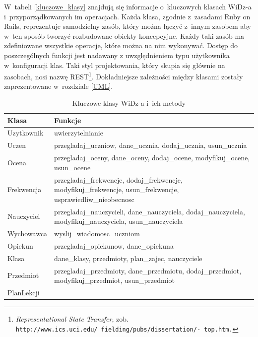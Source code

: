 \documentclass[12pt,leqno,twoside]{mwart}
\begin{document}
\indent W~tabeli \ref{kluczowe_klasy} znajdują się informacje o~kluczowych klasach WiDz-a i~przyporządkowanych im operacjach. Każda klasa, zgodnie z~zasadami Ruby on Rails, reprezentuje samodzielny zasób, który można łączyć z~innym zasobem aby w~ten sposób tworzyć rozbudowane obiekty koncepcyjne. Każdy taki zasób ma zdefiniowane wszystkie operacje, które można na nim wykonywać. Dostęp do poszczególnych funkcji jest nadawany z uwzględnieniem typu użytkownika w~konfiguracji klas. Taki styl projektowania, który skupia się głównie na zasobach, nosi nazwę REST\footnote{\textit{Representational State Transfer}, zob. \tt{http://www.ics.uci.edu/~fielding/pubs/dissertation/}\rm{-} \tt{top.htm}.}. Dokładniejsze zależności między klasami zostały zaprezentowane w~rozdziale \ref{UML}.
\begin{table}[h]
	\centering
	\caption{Kluczowe klasy WiDz-a i~ich metody}
		\rule{0pt}{3ex}
		\begin{tabular}{|l|p{12cm}|}
		\hline
		\textbf{Klasa} & \textbf{Funkcje} \\ \hline
		Uzytkownik & uwierzytelnianie \\ \hline
		Uczen & 
			\parbox[t]{12cm}{
			\raggedright
				przegladaj\_uczniow, dane\_ucznia, dodaj\_ucznia, usun\_ucznia
			}\\ \hline
		Ocena & 
			\parbox[t]{12cm}{
			\raggedright
				przegladaj\_oceny, dane\_oceny, dodaj\_ocene, modyfikuj\_ocene, usun\_ocene
			} \\ \hline
		Frekwencja &
			\parbox[t]{12cm}{
			\raggedright			
				przegladaj\_frekwencje, dodaj\_frekwencje, modyfikuj\_frekwencje, usun\_frekwencje, usprawiedliw\_nieobecnosc
			}\\ \hline
		Nauczyciel &
			\parbox[t]{12cm}{
			\raggedright			
				przegladaj\_nauczycieli, dane\_nauczyciela, dodaj\_nauczyciela, modyfikuj\_nauczyciela, usun\_nauczyciela
			} \\ \hline
		Wychowawca & wyslij\_wiadomosc\_uczniom \\ \hline
		Opiekun & przegladaj\_opiekunow, dane\_opiekuna \\ \hline
		Klasa & dane\_klasy, przedmioty, plan\_zajec, nauczyciele \\ \hline
		Przedmiot &
			\parbox[t]{12cm}{
			\raggedright			
				przegladaj\_przedmioty, dane\_przedmiotu, dodaj\_przedmiot, modyfikuj\_przedmiot, usun\_przedmiot 
			}\\ \hline
		PlanLekcji &
			\parbox[t]{12cm}{
			\raggedright			
}
\end{tabular}
\end{table}
\end{document}
